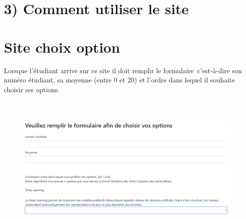 \documentclass[12pt]{article}
\begin{document}
\vspace{\baselineskip}
\section*{3) Comment utiliser le site}

\vspace{\baselineskip}
\section{Site choix option}

\vspace{\baselineskip}
\begin{adjustwidth}{0.49in}{0.0in}
Lorsque l’étudiant arrive sur ce site il doit remplir le formulaire c’est-à-dire son numéro étudiant, sa moyenne (entre 0 et 20) et l’ordre dans lequel il souhaite choisir ses options.\par

\end{adjustwidth}




\begin{figure}[H]
	\begin{Center}
		\includegraphics[width=6.29in,height=2.86in]{./media/image2.png}
	\end{Center}
\end{figure}



\par
\end{document}
